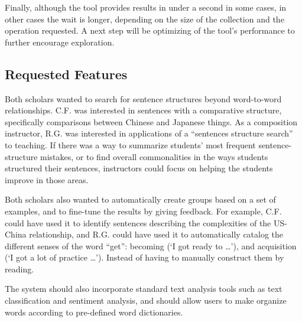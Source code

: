 \documentclass{sig-alternate}
\begin{document}
Finally, although the tool provides results in under a second in some cases, in other cases the wait is longer, depending on the size of the collection and the operation requested.  A next step will be optimizing of the tool's performance to further encourage exploration. 
 
 \subsection{Requested Features}
 Both scholars wanted to search for sentence structures beyond word-to-word relationships. C.F. was interested in sentences with a comparative structure, specifically comparisons between  Chinese and Japanese things. As a composition instructor, R.G. was interested in applications of a ``sentences structure search'' to teaching.  If there was a way to summarize students' most frequent sentence-structure mistakes, or to find overall commonalities in the ways students structured their sentences, instructors could focus on helping the students improve in those areas.
 
Both scholars also wanted to automatically create groups based on a set of examples, and to fine-tune the results by giving feedback. For example, C.F. could have used it to identify sentences describing the complexities of the US-China relationship, and R.G. could have used it to automatically catalog the different senses of the word ``get'':  becoming (`I got ready to \ldots'), and acquisition (`I got a lot of practice \ldots'). Instead of having to manually construct them by reading.
 
The system should also incorporate standard text analysis tools such as text classification and sentiment analysis, and should allow users to make organize words according to pre-defined word dictionaries.


 
  
\end{document}
